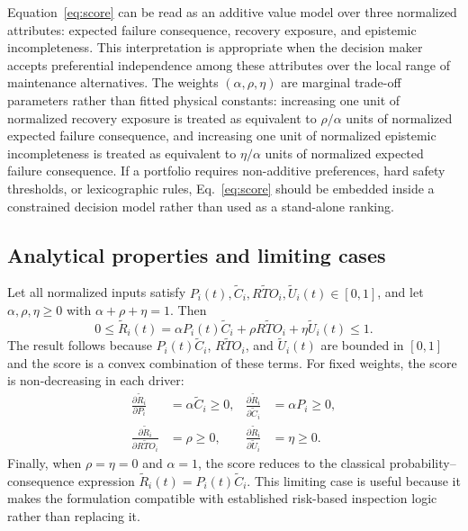 \documentclass[cmes,article,submit,moreauthors,pdftex]{Definitions/tsp}
\begin{document}
Equation~\eqref{eq:score} can be read as an additive value model over three normalized attributes: expected failure consequence, recovery exposure, and epistemic incompleteness. This interpretation is appropriate when the decision maker accepts preferential independence among these attributes over the local range of maintenance alternatives. The weights $(\alpha,\rho,\eta)$ are marginal trade-off parameters rather than fitted physical constants: increasing one unit of normalized recovery exposure is treated as equivalent to $\rho/\alpha$ units of normalized expected failure consequence, and increasing one unit of normalized epistemic incompleteness is treated as equivalent to $\eta/\alpha$ units of normalized expected failure consequence. If a portfolio requires non-additive preferences, hard safety thresholds, or lexicographic rules, Eq.~\eqref{eq:score} should be embedded inside a constrained decision model rather than used as a stand-alone ranking.

\subsection{Analytical properties and limiting cases}
\label{subsec:analytical-properties}

Let all normalized inputs satisfy $P_i(t),\widetilde{C}_i,\widetilde{RTO}_i,\widetilde{U}_i(t)\in[0,1]$, and let $\alpha,\rho,\eta\ge0$ with $\alpha+\rho+\eta=1$. Then
\begin{equation}
0 \leq
\widetilde{R}_i(t)
=
\alpha P_i(t)\widetilde{C}_i
+ \rho \widetilde{RTO}_i
+ \eta \widetilde{U}_i(t)
\leq 1.
\end{equation}
The result follows because $P_i(t)\widetilde{C}_i$, $\widetilde{RTO}_i$, and $\widetilde{U}_i(t)$ are bounded in $[0,1]$ and the score is a convex combination of these terms. For fixed weights, the score is non-decreasing in each driver:
\begin{align}
\frac{\partial \widetilde{R}_i}{\partial P_i} &= \alpha\widetilde{C}_i \ge 0,
&
\frac{\partial \widetilde{R}_i}{\partial \widetilde{C}_i} &= \alpha P_i \ge 0,\\
\frac{\partial \widetilde{R}_i}{\partial \widetilde{RTO}_i} &= \rho \ge 0,
&
\frac{\partial \widetilde{R}_i}{\partial \widetilde{U}_i} &= \eta \ge 0.
\end{align}
Finally, when $\rho=\eta=0$ and $\alpha=1$, the score reduces to the classical probability--consequence expression $\widetilde{R}_i(t)=P_i(t)\widetilde{C}_i$. This limiting case is useful because it makes the formulation compatible with established risk-based inspection logic rather than replacing it.
\end{document}
